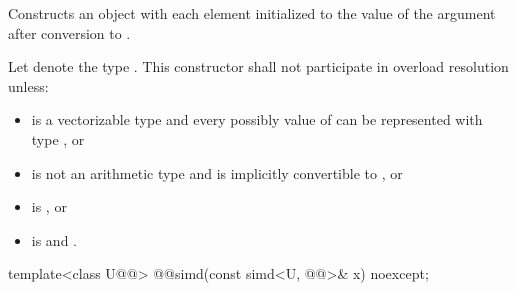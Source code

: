 \begin{itemdescr}
  \pnum\effects
  Constructs an object with each element initialized to the value of the argument after conversion to .

  \pnum\remarks
  Let  denote the type . This constructor shall not participate in overload resolution unless:
  \begin{itemize}
    \item {} is a vectorizable type and every possibly value of  can be represented with type , or
    \item {} is not an arithmetic type and is implicitly convertible to , or
    \item {} is , or
    \item {} is  and .%
  \end{itemize}

\end{itemdescr}

\begin{itemdecl}
template<class U@@> @@simd(const simd<U, @@>& x) noexcept;
\end{itemdecl}

